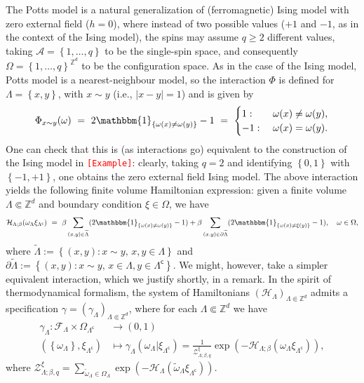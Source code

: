 \documentclass[12pt]{article}
\newcommand{\A}{\mathcal{A}}
\newcommand{\F}{\mathcal{F}}
\renewcommand{\H}{\mathcal{H}}
\newcommand{\Z}{\mathbb{Z}}
\newcommand{\ZZ}{\mathcal{Z}}
\newcommand{\set}[1]{\left\{#1\right\}}
\newcommand{\oklepaj}[1]{\left(#1\right)}
\newcommand{\ra}{\rightarrow}
\newcommand{\1}{\mathbbm{1}}
\renewcommand{\c}{\mathsf{c}}
\newcommand{\5}{\vspace{0.5cm}}
\renewcommand{\tilde}{\widetilde}
\theoremstyle{definition}
\begin{document}
The Potts model is a natural generalization of (ferromagnetic) Ising model with zero external field ($h=0$), where instead of two possible values ($+1$ and $-1$, as in the context of the Ising model), the spins may assume $q\geq 2$ different values, taking $\A=\set{1,\ldots,q}$ to be the single-spin space, and consequently $\Omega=\set{1,\ldots,q}^{\Z^d}$ to be the configuration space. As in the case of the Ising model, Potts model is a nearest-neighbour model, so the interaction $\Phi$ is defined for $\Lambda=\set{x,y}$, with $x\sim y$ (i.e., $|x-y|=1$) and is given by
$$\Phi_{x\sim y}(\omega) ~=~ 2\1_{\set{\omega(x)\neq \omega(y)}}-1 ~=~ \begin{cases}
1: ~&\omega(x)\neq\omega(y), \\
-1: ~&\omega(x)=\omega(y).
\end{cases}$$
One can check that this is (as interactions go) equivalent to the construction of the Ising model in \textcolor{red}{\texttt{[Example]}}: clearly, taking $q=2$ and identifying $\set{0,1}$ with $\set{-1,+1}$, one obtains the zero external field Ising model. The above interaction yields the following finite volume Hamiltonian expression: given a finite volume $\Lambda\Subset\Z^d$ and boundary condition $\xi\in\Omega$, we have
$$\H_{\Lambda;\beta}(\omega_\Lambda\xi_{\Lambda^\c}) ~=~ \beta\sum_{(x,y)\in\tilde{\Lambda}}(2\1_{\set{\omega(x)\neq\omega(y)}}-1)+\beta\sum_{(x,y)\in\partial\tilde{\Lambda}}(2\1_{\set{\omega(x)\neq\xi(y)}}-1), \quad \omega\in\Omega,$$
where $\tilde{\Lambda}:=\set{(x,y):x\sim y,\,x,y\in\Lambda}$ and $\partial\tilde{\Lambda}:=\set{(x,y):x\sim y,\,x\in\Lambda,y\in\Lambda^\c}$. We might, however, take a simpler equivalent interaction, which we justify shortly, in a remark. In the spirit of thermodynamical formalism, the system of Hamiltonians $(\H_\Lambda)_{\Lambda\Subset\Z^d}$ admits a specification $\gamma=(\gamma_\Lambda)_{\Lambda\Subset\Z^d}$, where for each $\Lambda\Subset\Z^d$ we have
\begin{align*}
\gamma_\Lambda:\F_\Lambda\times\Omega_{\Lambda^\c}&\ra (0,1) \\
(\set{\omega_{\Lambda}},\xi_{\Lambda^\c})&\mapsto\gamma_{\Lambda}(\omega_{\Lambda}|\xi_{\Lambda^\c})=\frac{1}{\ZZ_{\Lambda;\beta,q}^\xi}\exp\!\oklepaj{-\H_{\Lambda;\beta}(\omega_\Lambda\xi_{\Lambda^\c})},
\end{align*}
where $\ZZ_{\Lambda;\beta,q}^\xi=\sum_{\tilde{\omega}_\Lambda\in\Omega_\Lambda}\exp\!\oklepaj{-\H_\Lambda(\tilde{\omega}_{\Lambda}\xi_{\Lambda^\c})}$.
\end{document}
